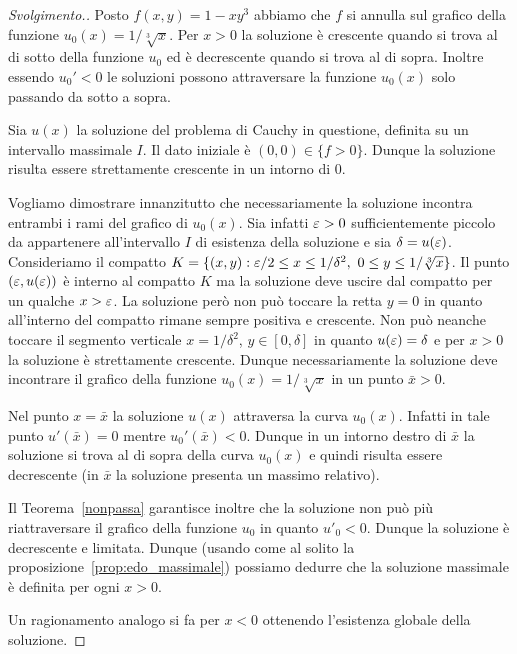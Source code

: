 \begin{proof}[Svolgimento.]
Posto $f(x,y)=1 - xy^3$ abbiamo che $f$ si annulla sul grafico della
funzione $u_0(x)=1/\sqrt[3] x$. Per $x>0$ la soluzione è crescente
quando si trova al di sotto della funzione $u_0$ ed è decrescente
quando si trova al di sopra. Inoltre essendo $u_0'<0$ le soluzioni possono
attraversare la funzione $u_0(x)$ solo passando da sotto a
sopra.

Sia $u(x)$ la soluzione del problema di Cauchy in questione, definita su
un intervallo massimale $I$. Il dato
iniziale è $(0,0)\in \{f>0\}$. Dunque la soluzione risulta essere
strettamente crescente in un intorno di $0$.

Vogliamo dimostrare innanzitutto che necessariamente la soluzione
incontra entrambi i rami del grafico di $u_0(x)$. Sia infatti
$\varepsilon>0$ sufficientemente piccolo da appartenere all'intervallo
$I$ di
esistenza della soluzione e sia $\delta=u(\varepsilon)$.
Consideriamo il compatto $K=\{(x,y):
\varepsilon/2 \le x \le 1/\delta^2,\ 0\le y\le 1/\sqrt[3]{x}\}$. Il punto
$(\varepsilon,u(\varepsilon))$ è interno al compatto $K$ ma la soluzione deve
uscire dal compatto
per un qualche $x>\varepsilon$.
La soluzione però non può toccare la
retta $y=0$ in quanto all'interno del compatto rimane sempre positiva
e crescente.
Non può neanche toccare il segmento verticale
$x=1/\delta^2$, $y\in[0,\delta]$ in quanto $u(\varepsilon)=\delta$ e per
$x>0$ la soluzione è strettamente crescente.
Dunque necessariamente
la soluzione deve incontrare il grafico della funzione
$u_0(x)=1/\sqrt[3]{x}$ in un punto $\bar x>0$.

Nel punto $x=\bar x$ la soluzione $u(x)$ attraversa la curva
$u_0(x)$. Infatti in tale punto $u'(\bar x)=0$ mentre $u_0'(\bar
x)<0$.
Dunque in un intorno destro di $\bar x$ la soluzione si trova
al di sopra della curva $u_0(x)$ e quindi risulta essere decrescente
(in $\bar x$ la soluzione presenta un massimo relativo).

Il Teorema~\ref{nonpassa} garantisce inoltre che la soluzione non
può più riattraversare il grafico della funzione $u_0$ in quanto
$u'_0<0$. Dunque la soluzione è decrescente e limitata.
Dunque (usando come al solito la proposizione~\ref{prop:edo_massimale})
possiamo dedurre che la soluzione massimale è definita per ogni $x>0$.

Un ragionamento analogo si fa per $x<0$ ottenendo l'esistenza globale
della soluzione.
\end{proof}

